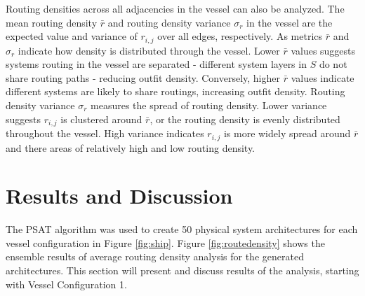 \documentclass[preprint,12pt]{elsarticle}
\begin{document}
Routing densities across all adjacencies in the vessel can also be analyzed. The mean routing density $\bar{r}$ and routing density variance $\sigma_r$ in the vessel are the expected value and variance of $r_{i,j}$ over all edges, respectively. As metrics $\bar{r}$ and $\sigma_r$ indicate how density is distributed through the vessel. Lower $\bar{r}$ values suggests systems routing in the vessel are separated - different system layers in $S$ do not share routing paths - reducing outfit density. Conversely, higher $\bar{r}$ values indicate different systems are likely to share routings, increasing outfit density. Routing density variance $\sigma_{r}$ measures the spread of routing density. Lower variance suggests $r_{i,j}$ is clustered around $\bar{r}$, or the routing density is evenly distributed throughout the vessel. High variance indicates $r_{i,j}$ is more widely spread around $\bar{r}$ and there areas of relatively high and low routing density.



\section{Results and Discussion}
The PSAT algorithm was used to create 50 physical system architectures for each vessel configuration in Figure \ref{fig:ship}. Figure \ref{fig:routedensity} shows the ensemble results of average routing density analysis for the generated architectures. This section will present and discuss results of the analysis, starting with Vessel Configuration 1.
\end{document}
